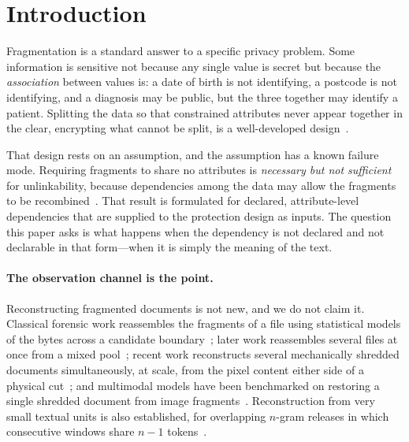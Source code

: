 \documentclass[sigconf,nonacm]{acmart}
\begin{document}

\maketitle

\section{Introduction}
\label{sec:intro}

Fragmentation is a standard answer to a specific privacy problem. Some
information is sensitive not because any single value is secret but because the
\emph{association} between values is: a date of birth is not identifying, a
postcode is not identifying, and a diagnosis may be public, but the three
together may identify a patient. Splitting the data so that constrained
attributes never appear together in the clear, encrypting what cannot be split,
is a well-developed design~\cite{ciriani2010}.

That design rests on an assumption, and the assumption has a known failure mode.
Requiring fragments to share no attributes is \emph{necessary but not
sufficient} for unlinkability, because dependencies among the data may allow the
fragments to be recombined~\cite{decapitani2014}. That result is formulated for
declared, attribute-level dependencies that are supplied to the protection design
as inputs. The question this paper asks is what happens when the dependency is
not declared and not declarable in that form---when it is simply the meaning of
the text.

\paragraph{The observation channel is the point.}
Reconstructing fragmented documents is not new, and we do not claim it. Classical
forensic work reassembles the fragments of a file using statistical models of
the bytes across a candidate boundary~\cite{shanmugasundaram2003}; later work
reassembles several files at once from a mixed pool~\cite{memonpal2006}; recent
work reconstructs several mechanically shredded documents simultaneously, at
scale, from the pixel content either side of a physical cut~\cite{paixao2020};
and multimodal models have been benchmarked on restoring a single shredded
document from image fragments~\cite{shredbench2026}. Reconstruction from very
small textual units is also established, for overlapping $n$-gram releases in
which consecutive windows share $n-1$ tokens~\cite{galle2015}.
\end{document}
